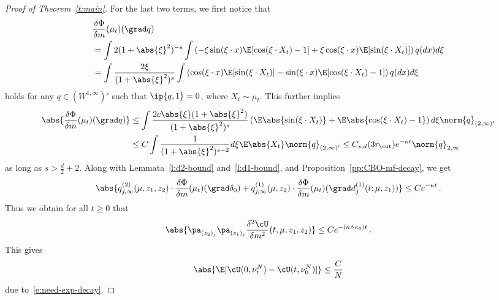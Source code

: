 \documentclass{amsart}
\begin{document}
\begin{proof}[Proof of Theorem~\ref{t:main}]
	For the last two terms, we first notice that 
	\begin{align*}
		& \frac{\delta \Phi}{\delta m}(\mu_t)(\grad q) \\
		& = \int 2(1+\abs{\xi}^2)^{-s} \int \left( -\xi \sin(\xi \cdot x) \E[\cos(\xi \cdot X_t)-1] + \xi \cos(\xi \cdot x) \E[\sin(\xi \cdot X_t)] \right) q(dx) d\xi \\
		& = \int \frac{2\xi}{(1+\abs{\xi}^2)^s} \int \left( \cos(\xi\cdot x) \E[\sin(\xi \cdot X_t)] - \sin(\xi \cdot x) \E[\cos(\xi \cdot X_t)-1] \right)  q(dx) d\xi 
	\end{align*}
	holds for any $q \in (W^{1,\infty})'$ such that $\ip{q,1} = 0$, where $X_t \sim \mu_t$. 
	This further implies 
	\begin{align*}
		\abs{\frac{\delta \Phi}{\delta m}(\mu_t)(\grad q)} & \le \int \frac{2c\abs{\xi}(1+\abs{\xi}^2)}{(1+\abs{\xi}^2)^s} \left( \E \abs{\sin(\xi\cdot X_t)} + \E\abs{\cos(\xi\cdot X_t) - 1} \right) d\xi \norm{q}_{(2,\infty)'}  \\
		& \le C \int \frac{1}{(1+\abs{\xi}^2)^{s-2}} d\xi \E \abs{X_t} \norm{q}_{(2,\infty)'}  \le C_{s,d} (3r_\cut) e^{-\kappa t} \norm{q}_{2,\infty}
	\end{align*}
	as long as $s > \frac{d}{2}+2$.
	Along with Lemmata~\ref{l:d2-bound} and~\ref{l:d1-bound}, and Proposition~\ref{pp:CBO-mf-decay}, we get
	\begin{equation*}
		\abs{q^{(2)}_{j,\infty}(\mu,z_1,z_2) \cdot \frac{\delta \Phi}{\delta m}(\mu_t) (\grad \delta_0) + q^{(1)}_{j,\infty}(\mu,z_2) \cdot \frac{\delta \Phi}{\delta m}(\mu_t) (\grad d^{(1)}_j(t;\mu,z_1)) } \le  C e^{-\kappa t} \,.
	\end{equation*}
	Thus we obtain for all $t \ge 0$ that 
	\begin{equation*}
		\abs{ \pa_{(z_2)_j} \pa_{(z_1)_j} \frac{\delta^2 \cU}{\delta m^2} (t,\mu,z_1,z_2) } \le C e^{-(\kappa \land \kappa_0) t} \,.
	\end{equation*}
	This gives 
	\begin{equation*}
		\abs{\E [\cU(0,\nu^N_t) - \cU(t,\nu^N_0)] } \le \frac{C}{N} 
	\end{equation*}
	due to~\eqref{e:need-exp-decay}.
	

\end{proof}
\end{document}
